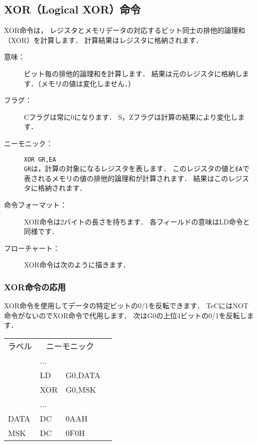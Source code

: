 \begin{center}
\end{center}

\newpage
\subsection{XOR（Logical XOR）命令}
XOR命令は，
レジスタとメモリデータの対応するビット同士の排他的論理和（XOR）を計算します．
計算結果はレジスタに格納されます．

\begin{description}
\item[意味：]ビット毎の排他的論理和を計算します．
結果は元のレジスタに格納します．（メモリの値は変化しません．）

\item[フラグ：]Cフラグは常に0になります．
S，Zフラグは計算の結果により変化します．

\item[ニーモニック：]{\tt XOR  GR,EA} \\
{\tt GR}は，計算の対象になるレジスタを表します．
このレジスタの値と{\tt EA}で表されるメモリの値の排他的論理和が計算されます．
結果はこのレジスタに格納されます．

\item[命令フォーマット：]XOR命令は2バイトの長さを持ちます．
各フィールドの意味はLD命令と同様です．


\item[フローチャート：]XOR命令は次のように描きます．

\begin{center}
\end{center}

\end{description}

\subsubsection{XOR命令の応用}
XOR命令を使用してデータの特定ビットの0/1を反転できます．
TeCにはNOT命令がないのでXOR命令で代用します．
次はG0の上位4ビットの0/1を反転します．

{\tt\small\begin{center}
\begin{tabular}{|l|l l|l}
\cline{1-3}
ラベル & \multicolumn{2}{|c|}{ニーモニック} & \\
\cline{1-3}
    & ...  &        & \\
    & LD   & G0,DATA& \\
    & XOR  & G0,MSK & \\
    & ...  &        & \\
DATA& DC   & 0AAH    & \\
MSK & DC   & 0F0H    & \\
\cline{1-3}
\end{tabular}
\end{center}}

